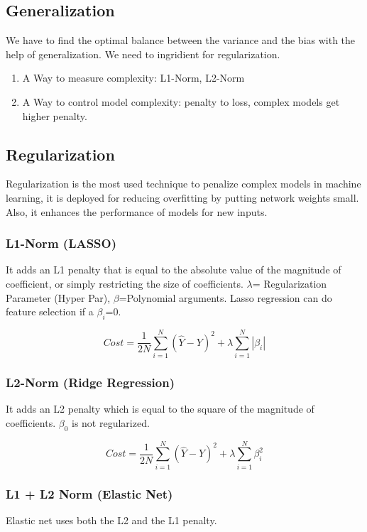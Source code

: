 \subsection{Generalization}
We have to find the optimal balance between the variance and the bias with the help of generalization. We need to ingridient for regularization.
\begin{enumerate}[topsep=0pt]
  \itemsep -0.5em
  \item A Way to measure complexity: L1-Norm, L2-Norm
  \item A Way to control model complexity: penalty to loss, complex models get higher penalty.
\end{enumerate}

\subsection{Regularization}
Regularization is the most used technique to penalize complex models in machine learning, it is deployed for reducing overfitting by putting network weights small. Also, it enhances the performance of models for new inputs.

\subsubsection{L1-Norm (LASSO)}
It adds an L1 penalty that is equal to the absolute value of the magnitude of coefficient, or simply restricting the size of coefficients.
$\lambda$= Regularization Parameter (Hyper Par), $\beta$=Polynomial arguments. Lasso regression can do feature selection if a $\beta_{i}$=0.

\[ Cost = \frac{1}{2N} \sum_{i=1}^N (\hat{Y}-Y)^2 + \lambda \sum_{i=1}^N |\beta_{i}| \]

\subsubsection{L2-Norm (Ridge Regression)}
It adds an L2 penalty which is equal to the square of the magnitude of coefficients. $\beta_{0}$ is not regularized.

\[ Cost = \frac{1}{2N} \sum_{i=1}^N (\hat{Y}-Y)^2 + \lambda \sum_{i=1}^N \beta_{i}^2 \]


\subsubsection{L1 + L2 Norm (Elastic Net)}
Elastic net uses both the L2 and the L1 penalty. 


